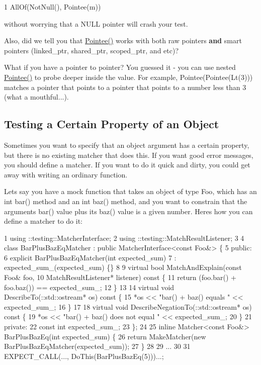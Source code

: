 \begin{DoxyCode}
1 AllOf(NotNull(), Pointee(m))
\end{DoxyCode}


without worrying that a {\ttfamily N\+U\+LL} pointer will crash your test.

Also, did we tell you that {\ttfamily \hyperlink{namespacetesting_a5122ca3533f3a00f67e146dd81f3b68c}{Pointee()}} works with both raw pointers {\bfseries and} smart pointers ({\ttfamily linked\+\_\+ptr}, {\ttfamily shared\+\_\+ptr}, {\ttfamily scoped\+\_\+ptr}, and etc)?

What if you have a pointer to pointer? You guessed it -\/ you can use nested {\ttfamily \hyperlink{namespacetesting_a5122ca3533f3a00f67e146dd81f3b68c}{Pointee()}} to probe deeper inside the value. For example, {\ttfamily Pointee(Pointee(\+Lt(3)))} matches a pointer that points to a pointer that points to a number less than 3 (what a mouthful...).

\subsection*{Testing a Certain Property of an Object}

Sometimes you want to specify that an object argument has a certain property, but there is no existing matcher that does this. If you want good error messages, you should define a matcher. If you want to do it quick and dirty, you could get away with writing an ordinary function.

Let\textquotesingle{}s say you have a mock function that takes an object of type {\ttfamily Foo}, which has an {\ttfamily int bar()} method and an {\ttfamily int baz()} method, and you want to constrain that the argument\textquotesingle{}s {\ttfamily bar()} value plus its {\ttfamily baz()} value is a given number. Here\textquotesingle{}s how you can define a matcher to do it\+:


\begin{DoxyCode}
1 using ::testing::MatcherInterface;
2 using ::testing::MatchResultListener;
3 
4 class BarPlusBazEqMatcher : public MatcherInterface<const Foo&> \{
5  public:
6   explicit BarPlusBazEqMatcher(int expected\_sum)
7       : expected\_sum\_(expected\_sum) \{\}
8 
9   virtual bool MatchAndExplain(const Foo& foo,
10                                MatchResultListener* listener) const \{
11     return (foo.bar() + foo.baz()) == expected\_sum\_;
12   \}
13 
14   virtual void DescribeTo(::std::ostream* os) const \{
15     *os << "bar() + baz() equals " << expected\_sum\_;
16   \}
17 
18   virtual void DescribeNegationTo(::std::ostream* os) const \{
19     *os << "bar() + baz() does not equal " << expected\_sum\_;
20   \}
21  private:
22   const int expected\_sum\_;
23 \};
24 
25 inline Matcher<const Foo&> BarPlusBazEq(int expected\_sum) \{
26   return MakeMatcher(new BarPlusBazEqMatcher(expected\_sum));
27 \}
28 
29 ...
30 
31   EXPECT\_CALL(..., DoThis(BarPlusBazEq(5)))...;
\end{DoxyCode}


